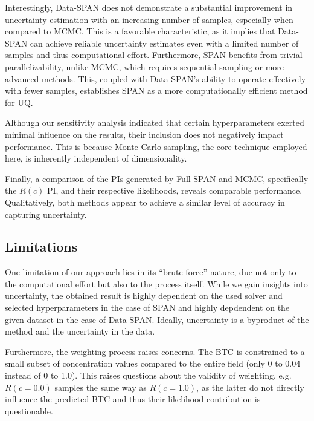 Interestingly, Data-SPAN does not demonstrate a substantial improvement in uncertainty estimation with an increasing number of samples, especially when compared to MCMC. This is a favorable characteristic, as it implies that Data-SPAN can achieve reliable uncertainty estimates even with a limited number of samples and thus computational effort. Furthermore, SPAN benefits from trivial parallelizability, unlike MCMC, which requires sequential sampling or more advanced methods. This, coupled with Data-SPAN's ability to operate effectively with fewer samples, establishes SPAN as a more computationally efficient method for UQ.

Although our sensitivity analysis indicated that certain hyperparameters exerted minimal influence on the results, their inclusion does not negatively impact performance. This is because Monte Carlo sampling, the core technique employed here, is inherently independent of dimensionality.

Finally, a comparison of the PIs generated by Full-SPAN and MCMC, specifically the $R(c)$ PI, and their respective likelihoods, reveals comparable performance. Qualitatively, both methods appear to achieve a similar level of accuracy in capturing uncertainty.




\subsection{Limitations}
One limitation of our approach lies in its ``brute-force'' nature, due not only to the computational effort but also to the process itself. While we gain insights into uncertainty, the obtained result is highly dependent on the used solver and selected hyperparameters in the case of SPAN and highly depdendent on the given dataset in the case of Data-SPAN. Ideally, uncertainty is a byproduct of the method and the uncertainty in the data.

Furthermore, the weighting process raises concerns. The BTC is constrained to a small subset of concentration values compared to the entire field (only 0 to 0.04 instead of 0 to 1.0). This raises questions about the validity of weighting, e.g. $R(c=0.0)$ samples the same way as $R(c=1.0)$, as the latter do not directly influence the predicted BTC and thus their likelihood contribution is questionable.


